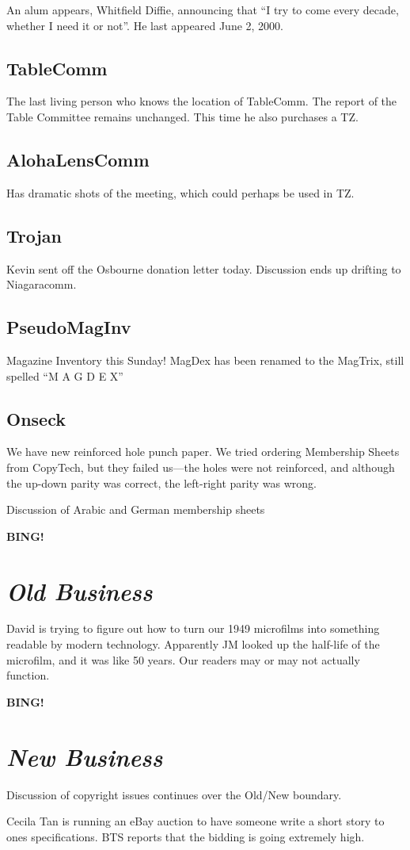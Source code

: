 \documentclass[10pt]{article}
\newcommand{\bing}{{\bf BING!} }
\newcommand{\goto}[1]{\bing \vskip 12pt \section*{{\em{#1}}}}
\begin{document}
An alum appears, Whitfield Diffie, announcing that ``I try to come
every decade, whether I need it or not''.  He last appeared June 2,
2000.

\subsection*{TableComm}
The last living person who knows the location of TableComm.  The
report of the Table Committee remains unchanged.  This time he also
purchases a TZ.

\subsection{AlohaLensComm} 
Has dramatic shots of the meeting, which could perhaps be used in TZ.

\subsection{Trojan}
Kevin sent off the Osbourne donation letter today.
Discussion ends up drifting to Niagaracomm. 

\subsection{PseudoMagInv}
Magazine Inventory this Sunday!
MagDex has been renamed to the MagTrix, still spelled ``M A G D E X''

\subsection{Onseck}
We have new reinforced hole punch paper.  We tried ordering Membership
Sheets from CopyTech, but they failed us---the holes were not
reinforced, and although the up-down parity was correct, the
left-right parity was wrong.

Discussion of Arabic and German membership sheets

\goto{Old Business}
David is trying to figure out how to turn our 1949 microfilms into
something readable by modern technology.  Apparently JM looked up the
half-life of the microfilm, and it was like 50 years.
Our readers may or may not actually function.

\goto{New Business}
Discussion of copyright issues continues over the Old/New boundary.

Cecila Tan is running an eBay auction to have someone write a short
story to ones specifications. BTS reports that the bidding is going
extremely high.
\end{document}
